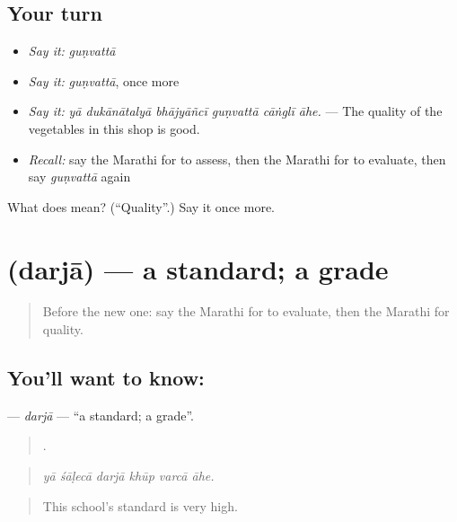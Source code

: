 \subsection*{Your turn}
\begin{itemize}
\raggedright
  \item \emph{Say it:} \emph{guṇvattā}
  \item \emph{Say it:} \emph{guṇvattā}, once more
  \item \emph{Say it:} \emph{yā dukānātalyā bhājyāñcī guṇvattā cāṅglī āhe.} — The quality of the vegetables in this shop is good.
  \item \emph{Recall:} say the Marathi for to assess, then the Marathi for to evaluate, then say \emph{guṇvattā} again
\end{itemize}

\begin{tcolorbox}[breakable,colback=teal!4,colframe=teal!35!black,title={Before you move on}]
What does  mean? (\textquotedblleft{}Quality\textquotedblright{}.) Say it once more.
\end{tcolorbox}
\section[\texorpdfstring{\mr{दर्जा} (darjā)}{दर्जा (darjā)}]{ (darjā) — a standard; a grade}

\label{lesson:MR-C376-darja}



\begin{quote}
Before the new one: say the Marathi for to evaluate, then the Marathi for quality.
\end{quote}

\subsection*{You'll want to know: }
\textbf{} — \emph{darjā} — \textquotedblleft{}a standard; a grade\textquotedblright{}.

\begin{quote}
     .
\end{quote}

\begin{quote}
\emph{yā śāḷecā darjā khūp varcā āhe.}
\end{quote}

\begin{quote}
This school's standard is very high.
\end{quote}


